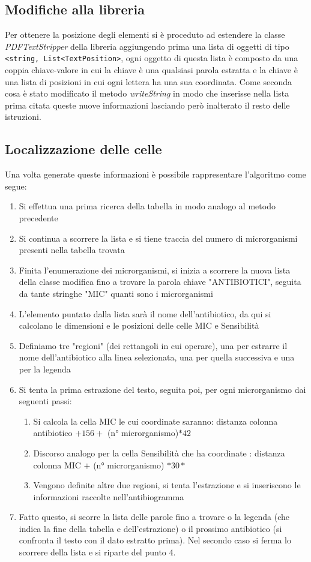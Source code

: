 \subsection{Modifiche alla libreria}
Per ottenere la posizione degli elementi si è proceduto ad estendere la classe \textit{PDFTextStripper} della libreria aggiungendo prima una lista di oggetti di tipo \texttt{<string, List<TextPosition>}, ogni oggetto di questa lista è composto da una coppia chiave-valore in cui la chiave è una qualsiasi parola estratta e la chiave è una lista di posizioni in cui ogni lettera ha una sua coordinata.
Come seconda cosa è stato modificato il metodo \textit{writeString} in modo che inserisse nella lista prima citata queste nuove informazioni lasciando però inalterato il resto delle istruzioni.
\newline
\subsection{Localizzazione delle celle}\label{Algoritmo finale}
Una volta generate queste informazioni è possibile rappresentare l'algoritmo come segue:
\begin{enumerate}
	\item Si effettua una prima ricerca della tabella in modo analogo al metodo precedente
	\item Si continua a scorrere la lista e si tiene traccia del numero di microrganismi presenti nella tabella trovata
	\item Finita l'enumerazione dei microrganismi, si inizia a scorrere la nuova lista della classe modifica fino a trovare la parola chiave "ANTIBIOTICI", seguita da tante stringhe "MIC" quanti sono i microrganismi
	\item L'elemento puntato dalla lista sarà il nome dell'antibiotico, da qui si calcolano le dimensioni e le posizioni delle celle MIC e Sensibilità
	\item Definiamo tre "regioni" (dei rettangoli in cui operare), una per estrarre il nome dell'antibiotico alla linea selezionata, una per quella successiva e una per la legenda
	\item Si tenta la prima estrazione del testo, seguita poi, per ogni microrganismo dai seguenti passi:
	\begin{enumerate}
		\item Si calcola la cella MIC le cui coordinate saranno: distanza colonna antibiotico $ + 156 + $ (n° microrganismo)$*42$
		\item Discorso analogo per la cella Sensibilità che ha coordinate : distanza colonna MIC $ + $ (n° microrganismo) $*30*$
		\item Vengono definite altre due regioni, si tenta l'estrazione e si inseriscono le informazioni raccolte nell'antibiogramma
		\end{enumerate}
		\item Fatto questo, si scorre la lista delle parole fino a trovare o la legenda (che indica la fine della tabella e dell'estrazione) o il prossimo antibiotico (si confronta il testo con il dato estratto prima). Nel secondo caso si ferma lo scorrere della lista e si riparte del punto 4.
\end{enumerate}
		
